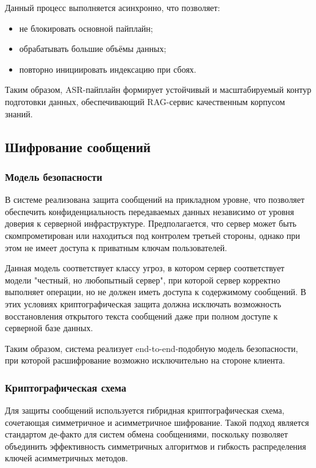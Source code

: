 \documentclass{article}
\begin{document}
Данный процесс выполняется асинхронно, что позволяет:
\begin{itemize}
\item не блокировать основной пайплайн;
\item обрабатывать большие объёмы данных;
\item повторно инициировать индексацию при сбоях.
\end{itemize}

Таким образом, ASR-пайплайн формирует устойчивый и масштабируемый контур подготовки данных, обеспечивающий RAG-сервис качественным корпусом знаний.
\subsection{Шифрование сообщений}

\subsubsection{Модель безопасности}

В системе реализована защита сообщений на прикладном уровне, что позволяет обеспечить конфиденциальность передаваемых данных независимо от уровня доверия к серверной инфраструктуре. Предполагается, что сервер может быть скомпрометирован или находиться под контролем третьей стороны, однако при этом не имеет доступа к приватным ключам пользователей.

Данная модель соответствует классу угроз, в котором сервер соответствует модели "честный, но любопытный сервер", 
при которой сервер корректно выполняет операции, но не должен иметь доступа к содержимому сообщений. В этих условиях криптографическая защита должна исключать возможность восстановления открытого текста сообщений даже при полном доступе к серверной базе данных.

Таким образом, система реализует end-to-end-подобную модель безопасности, при которой расшифрование возможно исключительно на стороне клиента.

\subsubsection{Криптографическая схема}

Для защиты сообщений используется гибридная криптографическая схема, сочетающая симметричное и асимметричное шифрование. Такой подход является стандартом де-факто для систем обмена сообщениями, поскольку позволяет объединить эффективность симметричных алгоритмов и гибкость распределения ключей асимметричных методов.
\end{document}
